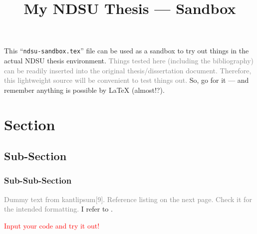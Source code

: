 \documentclass[12pt,chapterrefs]{ndsu-thesis-2022}
\title{\vspace{-9pt}My NDSU Thesis --- Sandbox}
\begin{document}

This ``\texttt{ndsu-sandbox.tex}'' file can be used as a sandbox to try out things in the actual NDSU thesis environment. \textcolor{gray}{Things tested here (including the bibliography) can be readily inserted into the original thesis/dissertation document. Therefore, this lightweight source will be convenient to test things out.} So, go for it --- and remember anything is possible by \LaTeX{} (almost!?).

\section{Section}
\subsection{Sub-Section}
\subsubsection{Sub-Sub-Section}

\textcolor{gray}{Dummy text from kantlipsum[9]. Reference listing on the next page. Check it for the intended formatting.} I refer to \citep{lamport94,kopka2004guide,baczkowski1990ndsu,cassuto2010advising,pires2021teens}. \kant[9]

\textcolor{red}{Input your code and try it out!}


\makerefs %


\closeappendices  %
\end{document}
